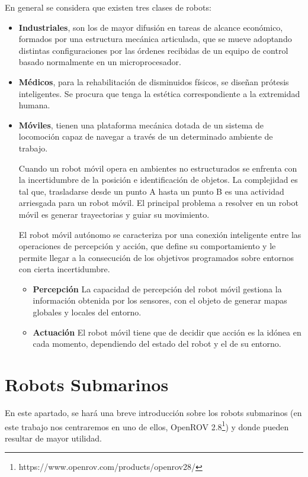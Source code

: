 En general se considera que existen tres clases de robots:
\begin{itemize}
\item \textbf{Industriales}, son los de mayor difusión en tareas de alcance económico, formados por una estructura mecánica articulada, que se mueve adoptando distintas configuraciones por las órdenes recibidas de un equipo de control basado normalmente en un microprocesador.
\item \textbf{Médicos}, para la rehabilitación de disminuidos físicos, se diseñan prótesis inteligentes. Se procura que tenga la estética correspondiente a la extremidad humana.
\item \textbf{Móviles}, tienen una plataforma mecánica dotada de un sistema de locomoción capaz de navegar a través de un determinado ambiente de trabajo.

Cuando un robot móvil opera en ambientes no estructurados se enfrenta con la incertidumbre de la posición e identificación de objetos. La complejidad es tal que, trasladarse desde un punto A hasta un punto B es una actividad arriesgada para un robot móvil.
El principal problema a resolver en un robot móvil es generar trayectorias y guiar su movimiento.

El robot móvil autónomo se caracteriza por una conexión inteligente entre las operaciones de percepción y acción, que define su comportamiento y le permite llegar a la consecución de los objetivos programados sobre entornos con cierta incertidumbre.
  \begin{itemize}
  \item \textbf{Percepción} La capacidad de percepción del robot móvil gestiona la información obtenida por los sensores, con el objeto de generar mapas globales y locales del entorno. 
  \item \textbf{Actuación}  El robot móvil tiene que de decidir que acción es la idónea en cada momento, dependiendo del estado del robot y el de su entorno.
  \end{itemize}
\end{itemize}


\section{Robots Submarinos}
\label{cap:Robots Submarinos}
En este apartado, se hará una breve introducción sobre los robots submarinos (en este trabajo nos centraremos en uno de ellos, OpenROV 2.8\footnote{https://www.openrov.com/products/openrov28/}) y donde pueden resultar de mayor utilidad.

